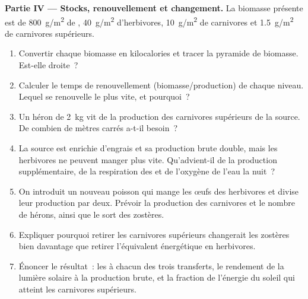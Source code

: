 \begin{problem}
\medskip
\noindent\textbf{Partie IV --- Stocks, renouvellement et changement.}
La biomasse présente est de \qty{800}{g/m^2} de ,
\qty{40}{g/m^2} d'herbivores, \qty{10}{g/m^2} de carnivores et
\qty{1.5}{g/m^2} de carnivores supérieurs.
\begin{enumerate}[resume]
  \item Convertir chaque biomasse en kilocalories et tracer la
        pyramide de biomasse. Est-elle droite~?
  \item Calculer le temps de renouvellement (biomasse/production) de
        chaque niveau. Lequel se renouvelle le plus vite, et pourquoi~?
  \item Un héron de \qty{2}{kg} vit de la production des carnivores
        supérieurs de la source. De combien de mètres carrés a-t-il
        besoin~?
  \item La source est enrichie d'engrais et sa production brute double,
        mais les herbivores ne peuvent manger plus vite. Qu'advient-il
        de la production supplémentaire, de la respiration des
         et de l'oxygène de l'eau la nuit~?
  \item On introduit un nouveau poisson qui mange les œufs des
        herbivores et divise leur production par deux. Prévoir la
        production des carnivores et le nombre de hérons, ainsi que le
        sort des zostères.
  \item Expliquer pourquoi retirer les carnivores supérieurs
        changerait les zostères bien davantage que retirer l'équivalent
        énergétique en herbivores.
  \item Énoncer le résultat~: les  à chacun des
        trois transferts, le rendement de la lumière solaire à la
        production brute, et la fraction de l'énergie du soleil qui
        atteint les carnivores supérieurs.
\end{enumerate}
\end{problem}
